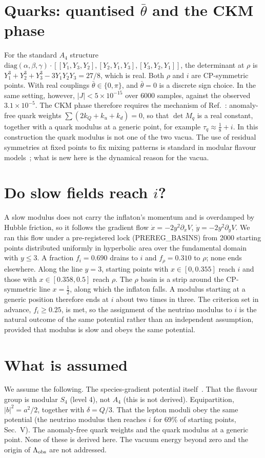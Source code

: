 \documentclass[aps,prd,twocolumn,superscriptaddress,nofootinbib,showkeys]{revtex4-2}
\begin{document}
\section{Quarks: quantised $\bar\theta$ and the CKM phase}
For the standard $A_4$ structure $\mathrm{diag}(\alpha,\beta,\gamma)\cdot[[Y_1,Y_3,Y_2],[Y_2,Y_1,Y_3],[Y_3,Y_2,Y_1]]$, the determinant at $\rho$ is $Y_1^3+Y_2^3+Y_3^3-3Y_1Y_2Y_3=27/8$, which is real. Both $\rho$ and $i$ are CP-symmetric points. With real couplings $\bar\theta\in\{0,\pi\}$, and $\bar\theta=0$ is a discrete sign choice. In the same setting, however, $|J|<5\times10^{-15}$ over $6000$ samples, against the observed $3.1\times10^{-5}$. The CKM phase therefore requires the mechanism of Ref.~\cite{FST}: anomaly-free quark weights $\sum(2k_Q+k_u+k_d)=0$, so that $\det M_q$ is a real constant, together with a quark modulus at a generic point, for example $\tau_q\approx\tfrac18+i$. In this construction the quark modulus is not one of the two vacua. The use of residual symmetries at fixed points to fix mixing patterns is standard in modular flavour models~\cite{NPP}; what is new here is the dynamical reason for the vacua.

\section{Do slow fields reach $i$?}
A slow modulus does not carry the inflaton's momentum and is overdamped by Hubble friction, so it follows the gradient flow $\dot x=-2y^2\partial_xV$, $\dot y=-2y^2\partial_yV$. We ran this flow under a pre-registered lock (PREREG\_BASINS) from 2000 starting points distributed uniformly in hyperbolic area over the fundamental domain with $y\le3$. A fraction $f_i=0.690$ drains to $i$ and $f_\rho=0.310$ to $\rho$; none ends elsewhere. Along the line $y=3$, starting points with $x\in[0,0.355]$ reach $i$ and those with $x\in[0.358,0.5]$ reach $\rho$. The $\rho$ basin is a strip around the CP-symmetric line $x=\tfrac12$, along which the inflaton falls. A modulus starting at a generic position therefore ends at $i$ about two times in three. The criterion set in advance, $f_i\ge0.25$, is met, so the assignment of the neutrino modulus to $i$ is the natural outcome of the same potential rather than an independent assumption, provided that modulus is slow and obeys the same potential.

\section{What is assumed}
We assume the following. The species-gradient potential itself~\cite{P1}. That the flavour group is modular $S_4$ (level 4), not $A_4$ (this is not derived). Equipartition, $|b|^2=a^2/2$, together with $\delta=Q/3$. That the lepton moduli obey the same potential (the neutrino modulus then reaches $i$ for 69\% of starting points, Sec.~V). The anomaly-free quark weights and the quark modulus at a generic point. None of these is derived here. The vacuum energy beyond zero and the origin of $\Lambda_{\rm obs}$ are not addressed.
\end{document}
